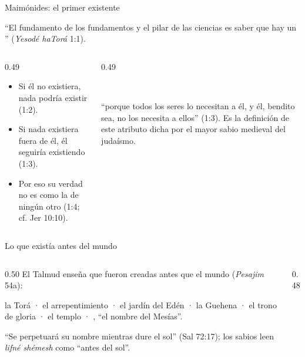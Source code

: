 \begin{frame}{Maimónides: el primer existente}
\begin{center}\end{center}
\small ``El fundamento de los fundamentos y el pilar de las ciencias es saber que hay un '' (\emph{Yesodé haTorá} 1:1).\par\medskip
\begin{columns}[t,onlytextwidth]
\begin{column}{0.49\textwidth}\scriptsize
\begin{itemize}
\item Si él no existiera, nada podría existir (1:2).
\item Si nada existiera fuera de él, él seguiría existiendo (1:3).
\item Por eso su verdad no es como la de ningún otro (1:4; cf. Jer 10:10).
\end{itemize}
\end{column}
\begin{column}{0.49\textwidth}
\begin{center}\\ \end{center}
\scriptsize ``porque todos los seres lo necesitan a él, y él, bendito sea, no los necesita a ellos'' (1:3). Es la definición de este atributo dicha por el mayor sabio medieval del judaísmo.
\end{column}
\end{columns}
\end{frame}

\begin{frame}{Lo que existía antes del mundo}
\begin{columns}[t,onlytextwidth]
\begin{column}{0.50\textwidth}\small
El Talmud enseña que  fueron creadas antes que el mundo (\emph{Pesajim} 54a):\par\smallskip
\scriptsize la Torá · el arrepentimiento · el jardín del Edén · la Guehena · el trono de gloria · el templo · , ``el nombre del Mesías''.\par\medskip
\begin{center}\end{center}
``Se perpetuará su nombre mientras dure el sol'' (Sal 72:17); los sabios leen \emph{lifné shémesh} como ``antes del sol''.
\end{column}
\begin{column}{0.48\textwidth}
\end{column}
\end{columns}
\end{frame}

